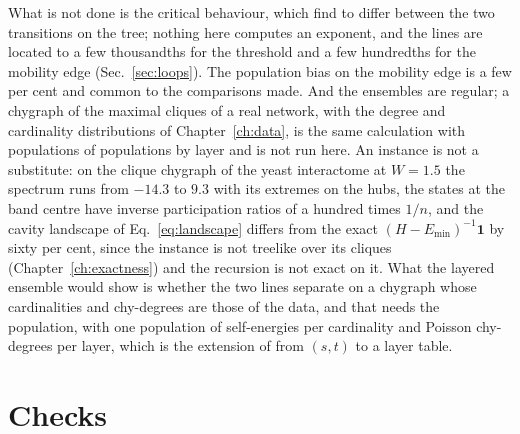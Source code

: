 What is not done is the critical behaviour, which \citeauthor{tonetti2026}
find to differ between the two transitions on the tree; nothing here
computes an exponent, and the lines are located to a few thousandths for the threshold and a few hundredths for the mobility edge (Sec.~\ref{sec:loops}). The population bias on the mobility edge is a few
per cent and common to the comparisons made. And the ensembles are
regular; a chygraph of the maximal cliques of a real network, with the
degree and cardinality distributions of Chapter~\ref{ch:data}, is the same
calculation with populations of populations by layer and is not run here.
An instance is not a substitute: on the clique chygraph of the yeast
interactome at $W=1.5$ the spectrum runs from $-14.3$ to $9.3$ with its
extremes on the hubs, the states at the band centre have inverse
participation ratios of a hundred times $1/n$, and the cavity landscape
of Eq.~\eqref{eq:landscape} differs from the exact
$(H-E_{\min})^{-1}\mathbf 1$ by sixty per cent, since the instance is not
treelike over its cliques (Chapter~\ref{ch:exactness}) and the recursion
is not exact on it. What the layered ensemble would show is whether the
two lines separate on a chygraph whose cardinalities and chy-degrees are
those of the data, and that needs the population, with one population of
self-energies per cardinality and Poisson chy-degrees per layer, which
is the extension of  from
$(s,t)$ to a layer table.

\section{Checks}
\label{sec:loc-checks}

